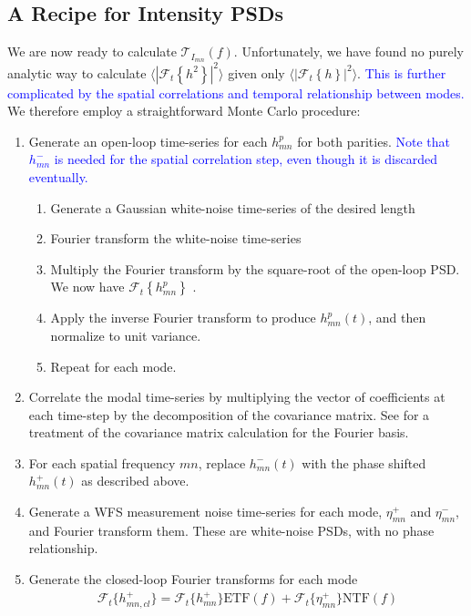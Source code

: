 \documentclass[10pt,preprint]{aastex631}
\newcommand{\jrmadd}[1]{\textcolor{blue}{#1}}
\begin{document}
\subsection{A Recipe for Intensity PSDs}
\label{sec:recipe}
We are now ready to calculate $\mathcal{T}_{I_{mn}}(f)$.  Unfortunately, we have found no purely analytic way to calculate $\langle \left| \mathcal{F}_t\left\{ h^2 \right\} \right|^2 \rangle$ given only $\langle \left| \mathcal{F}_t\left\{ h \right\} \right|^2 \rangle$. \jrmadd{ This is further complicated by the spatial correlations and temporal relationship between modes.}  We therefore employ a straightforward Monte Carlo procedure:
\begin{enumerate}
\item Generate an open-loop time-series for each $h_{mn}^p$ for both parities.  \jrmadd{Note that $h_{mn}^-$ is needed for the spatial correlation step, even though it is discarded eventually.} \label{step:olh}
\begin{enumerate}
\item Generate a Gaussian white-noise time-series of the desired length
\item Fourier transform the white-noise time-series
\item Multiply the Fourier transform by the square-root of the open-loop PSD.  We now have $\mathcal{F}_t\left\{h_{mn}^p\right\}$ \citep[cf.][]{kasdin_falpha}.
\item Apply the inverse Fourier transform to produce $h_{mn}^p(t)$, and then normalize to unit variance.
\item Repeat for each mode.
\end{enumerate}
\item Correlate the modal time-series by multiplying the vector of coefficients at each time-step by the decomposition of the covariance matrix.  See \citet{2018JATIS...4a9001M} for a treatment of the covariance matrix calculation for the Fourier basis.
\item For each spatial frequency $mn$, replace $h_{mn}^-(t)$ with the phase shifted $h_{mn}^+(t)$ as described above.
\item Generate a WFS measurement noise time-series for each mode, $\eta_{mn}^+$ and $\eta_{mn}^-$, and Fourier transform them.  These are white-noise PSDs, with no phase relationship.
\item Generate the closed-loop Fourier transforms for each mode \label{step:clh}
\begin{eqnarray}
\mathcal{F}_t\{h_{mn,cl}^+\} = \mathcal{F}_t\{h_{mn}^+\} \mathrm{ETF}(f) + \mathcal{F}_t\{\eta_{mn}^+\} \mathrm{NTF}(f) \\

\end{eqnarray}
\end{enumerate}
\end{document}
